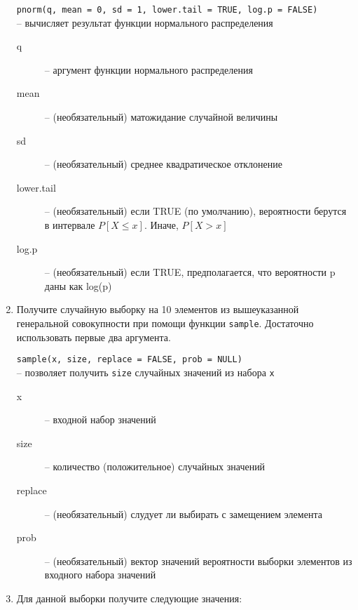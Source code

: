 \begin{enumerate}
\begin{mdframed}[style=BadassFrame]
              \texttt{pnorm(q, mean = 0, sd = 1, lower.tail = TRUE, log.p = FALSE)} \\
                -- вычисляет результат функции нормального распределения
              \begin{description}

                \item[q] -- аргумент функции нормального распределения
                \item[mean] -- (необязательный) матожидание случайной величины
                \item[sd] -- (необязательный) среднее квадратическое отклонение
                \item[lower.tail] -- (необязательный) если TRUE (по умолчанию), вероятности берутся в интервале $P[X \leq x]$. Иначе, $P[X > x]$ 
                \item[log.p] -- (необязательный) если TRUE, предполагается, что вероятности p даны как log(p)
              \end{description}
          \end{mdframed}

    \item Получите случайную выборку на 10 элементов из вышеуказанной генеральной совокупности при помощи функции
          \texttt{sample}. Достаточно использовать первые два аргумента.

          \begin{mdframed}[style=BadassFrame]

              \texttt{sample(x, size, replace = FALSE, prob = NULL)} \\
                -- позволяет получить \texttt{size} случайных значений из набора \texttt{x}
              \begin{description}

                \item[x] -- входной набор значений
                \item[size] -- количество (положительное) случайных значений
                \item[replace] -- (необязательный) слудует ли выбирать с замещением элемента
                \item[prob] -- (необязательный) вектор значений вероятности выборки элементов из входного набора значений
              \end{description}
          \end{mdframed}

    \item Для данной выборки получите следующие значения: 


\end{enumerate}
